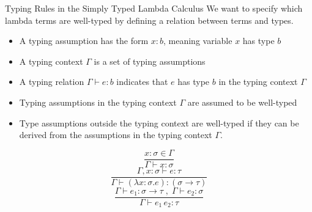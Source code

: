 \documentclass[
	aspectratio=169, %
	8pt, %
]{beamer}
\begin{document}
\begin{frame}{\insertsubsection}
		\begin{definition}{Typing Rules in the Simply Typed Lambda Calculus}
				We want to specify which lambda terms are well-typed by defining a relation between terms and types.
						\begin{itemize}
							\item{ A typing assumption has the form $x:b$, meaning variable $x$ has type $b$ }
							\item{ A typing context $\Gamma$ is a set of typing assumptions }
							\item{ A typing relation $\Gamma \vdash e:b$ indicates that $e$ has type $b$ in the typing context $\Gamma$}
							\item{ Typing assumptions in the typing context $\Gamma$ are assumed to be well-typed}
							\item{ Type assumptions outside the typing context are well-typed if they can be derived from the assumptions in the typing context $\Gamma$. }
						\end{itemize}

						\begin{fancycolumns}[columns=3,animation=none]
								\begin{equation}
												\frac{x:\sigma \in \Gamma}{\Gamma \vdash x:\sigma}
								\end{equation}
								\nextcolumn
								\begin{equation}
												\frac{\Gamma, x:\sigma \vdash e:\tau}{\Gamma \vdash (\lambda x: \sigma . e) : (\sigma \rightarrow \tau)}
								\end{equation}
								\nextcolumn
								\begin{equation}
												\frac{\Gamma \vdash e_1: \sigma \rightarrow \tau \;,\; \Gamma \vdash e_2:\sigma}{\Gamma \vdash e_1 \, e_2 : \tau}
								\end{equation}
						\end{fancycolumns}

		\end{definition}
\end{frame}
\end{document}
